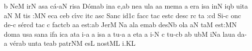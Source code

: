 \initiumgregorianum
\znotes\fissum{1pt}\bmolle b\en
%
\sgn Ne{}\punctum M\egn
\spatium
\begingroup
\bgenerale
\sgn {}i{r}\punctum N\egn
\sgn {}as\punctum a\egn
\sgn c{\'a}{-}\clivis aN\egn
\sgn ris\punctum a\egn
\spatium
\sgn D{\'o}{m}\pes ab\egn
\sgn {}i{n}\punctum a\egn
\sgn {}e,\punctum a\augmentum b\egn
\spatium
\divisiominima
\spatium
\sgn ne{}\punctum a\egn
\spatium
\sgn {}ul\punctum a\egn
{}a{}\punctum a\egn
\spatium
\sgn me{m}\punctum a\egn
{}\punctum a\egn
\sgn {}e{r}\punctum a\egn
\sgn {}is\punctum a\egn
\spatium
\sgn {}i{n}\punctum N\egn
\sgn {}iq\punctum b\egn
\sgn ui{t}\punctum a\egn
{}\clivis aN\egn
\custos M
\lineaproxima
\sgn ti{s :}\punctum M\augmentum N\egn
\spatium
\divisiomaior
\spatium
\sgn {}ec\punctum a\egn
\sgn ce{}\punctum b\egn
\spatium
\sgn c{\'\i}{v}\punctum c\egn
\sgn {}i{t}\punctum c\egn
\sgn {}as\punctum c\egn
\spatium
\sgn S{a}n\punctum c\egn
{}i{}\episem d1\punctum c\egn
\spatium
\sgn f{a}c\punctum c\egn
\sgn ta{}\punctum c\egn
\spatium
\sgn {}e{st}\punctum c\egn
\spatium
\sgn de{s}\punctum c\egn
{}r\punctum c\egn
\sgn ta{ :}\punctum c\augmentum d\egn
\spatium
\divisiominima
\spatium
\sgn S{i}{-}\punctum c\egn
\sgn {}on\punctum c\egn
\spatium
\sgn de{-}\punctum c\egn
\sgn s{\'e}r\pes cd\egn
\sgn ta{}\punctum c\egn
\spatium
\custos c
\lineaproxima
\sgn f{a}{ct}\clivis cb\egn
\sgn {}a{}\punctum a\egn
\spatium
\sgn {}e{st:}\punctum a\augmentum b\egn
\spatium
\divisiominor
\spatium
\sgn Je{r}\punctum M\egn
{}\pes Na\egn
\sgn {}a{l}\punctum a\egn
\sgn {}em\punctum a\augmentum b\egn
\spatium
\sgn de{s}\pes Nb\egn
\sgn {}o{l}\punctum a\egn
{}\clivis aN\egn
\sgn ta{}\punctum M\egn
\spatium
\sgn {}e{st:}\punctum M\augmentum N\egn
\spatium
\divisiomaior
\spatium
\sgn d{o}m\punctum a\egn
\sgn {}us\punctum a\egn
\spatium
\sgn san\punctum a\egn
{}i{f}\punctum a\egn
\sgn {}i{c}\punctum a\egn
\sgn {}a{t}\punctum a\egn
\sgn {}i{-}\punctum a\egn
{}\punctum a\egn
\sgn {}is\punctum a\egn
\spatium
\custos a
\lineaproxima
\sgn t{u}{-}\punctum a\egn
\sgn {}{\ae}{}\punctum a\egn
\spatium
\sgn et{}\punctum a\egn
\spatium
{}\punctum a\egn
\sgn {}i{-}\punctum N\egn
\sgn {}{\ae}{}\punctum c\egn
\spatium
\sgn t{u}{-}\clivis cb\egn
\sgn {}{\ae}{,}\punctum a\augmentum b\egn
\spatium
\divisiominor
\spatium
\sgn {}u{b}\punctum M\egn
\sgn {}i{}\pes Na\egn
\spatium
\sgn lau\punctum a\egn
\sgn da{-}\punctum a\egn
\sgn v{\'e}{r}\pes ab\egn
\sgn {}u{nt}\punctum a\egn
\spatium
\sgn te{}\punctum a\augmentum b\egn
\spatium
\sgn p{a}{tr}\clivis NM\egn
\sgn {}es\punctum L\egn
\spatium
\sgn n{o}{st}\clivis ML\egn
{}i.\punctum K\augmentum L\egn
\endgroup
\Finisgregoriana

